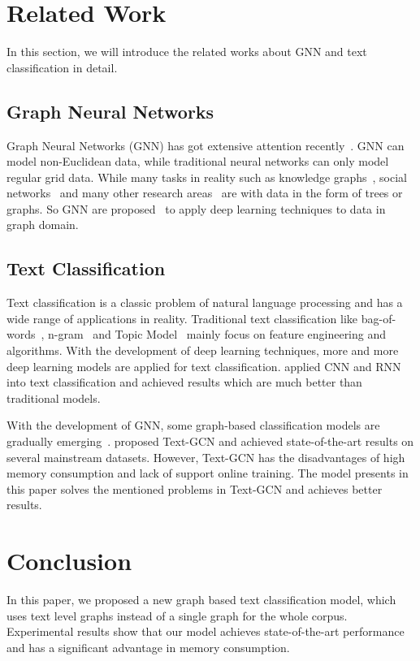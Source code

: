 \documentclass[11pt,a4paper]{article}
\begin{document}
\section{Related Work}
In this section, we will introduce the related works about GNN and text classification in detail. 
\subsection{Graph Neural Networks}
Graph Neural Networks (GNN) has got extensive attention recently~\cite{zhou2018graph, zhang2018deep, wu2019comprehensive}. GNN can model non-Euclidean data, while traditional neural networks can only model regular grid data. While many tasks in reality such as knowledge graphs~\cite{hamaguchi2017knowledge}, social networks~\cite{hamilton2017inductive} and many other research areas~\cite{khalil2017learning} are with data in the form of trees or graphs. So GNN are proposed~\cite{scarselli2009graph} to apply deep learning techniques to data in graph domain. 

\subsection{Text Classification}
Text classification is a classic problem of natural language processing and has a wide range of applications in reality. Traditional text classification like bag-of-words~\cite{zhang2010understanding}, n-gram~\cite{wang2012baselines} and Topic Model~\cite{wallach2006topic} mainly focus on feature engineering and algorithms. With the development of deep learning techniques, more and more deep learning models are applied for text classification.  applied CNN and RNN into text classification and achieved results which are much better than traditional models. 

With the development of GNN, some graph-based classification models are gradually emerging~\cite{hamilton2017inductive, velivckovic2017graph, peng2018large}.  proposed Text-GCN and achieved state-of-the-art results on several mainstream datasets. However, Text-GCN has the disadvantages of high memory consumption and lack of support online training. The model presents in this paper solves the mentioned problems in Text-GCN and achieves better results.

\section{Conclusion}
In this paper, we proposed a new graph based text classification model, which uses text level graphs instead of a single graph for the whole corpus. Experimental results show that our model achieves state-of-the-art performance and has a significant advantage in memory consumption. 
\end{document}
